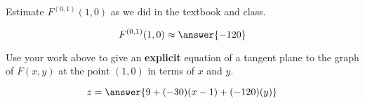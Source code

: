 \documentclass{ximera}
\begin{document}
\begin{problem}
Estimate $F^{(0,1)}(1,0)$ as we did in the textbook and class.
\begin{prompt}
\[
  F^{(0,1)}(1,0) \approx \answer{-120}
\]
\end{prompt}

\vfill

\end{problem}


\begin{problem}
  Use your work above to give an \textbf{explicit} equation of a
  tangent plane to the graph of $F(x,y)$ at the point $(1,0)$ in terms
  of $x$ and $y$.
\begin{prompt}
\[
z = \answer{9 + (-30)(x - 1) + (-120)(y)}
\]
\end{prompt}

\vfill

\end{problem}



  
\end{document}
